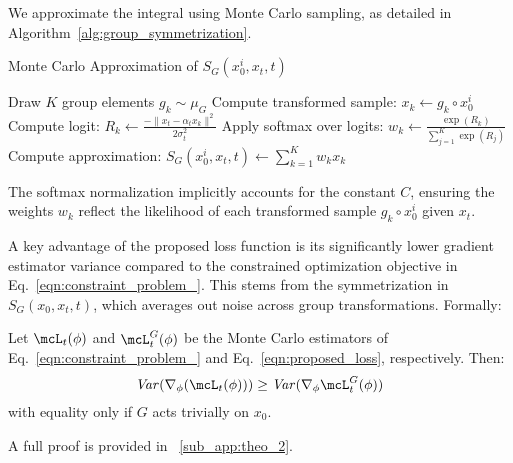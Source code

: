 We approximate the integral using Monte Carlo sampling, as detailed in Algorithm~\ref{alg:group_symmetrization}.  

\begin{algorithm}[H]
    \caption{Monte Carlo Approximation of \( S_G(x_0^i, x_t, t) \)}
    \label{alg:group_symmetrization}
    \begin{algorithmic}[1]
        \STATE Draw \( K \) group elements \( g_k \sim \mu_G \)
            \STATE Compute transformed sample: \( x_k \leftarrow g_k \circ x_0^i \)
            \STATE Compute logit: \( R_k \leftarrow \frac{-\| x_t - \alpha_t x_k \|^2}{2\sigma_t^2} \)
        \ENDFOR
        \STATE Apply softmax over logits: \( w_k \leftarrow \frac{\exp(R_k)}{\sum_{j=1}^K \exp(R_j)} \)
        \STATE Compute approximation: \( S_G(x_0^i, x_t, t) \leftarrow \sum_{k=1}^K w_k x_k \)
    \end{algorithmic}
\end{algorithm}



The softmax normalization implicitly accounts for the constant \(C\), ensuring the weights \(w_k\) reflect the likelihood of each transformed sample \(g_k \circ x_0^i\) given \(x_t\).



A key advantage of the proposed loss function is its significantly lower gradient estimator variance compared to the constrained optimization objective in Eq.~\eqref{eqn:constraint_problem_}. This stems from the symmetrization in \(S_G(x_0, x_t, t)\), which averages out noise across group transformations. Formally:
\begin{tcolorbox}[title=Variance Reduction of the Proposed Loss]
\begin{theorem}
Let \(\mcL_t(\phi)\) and \(\mcL_t^G(\phi)\) be the Monte Carlo estimators of Eq.~\eqref{eqn:constraint_problem_} and Eq.~\eqref{eqn:proposed_loss}, respectively. Then:
\begin{equation}
    \text{\emph{Var}}(\nabla_\phi(\mcL_t(\phi))) \geq \text{\emph{Var}}(\nabla_\phi\mcL_t^G(\phi))
\end{equation}
with equality only if \(G\) acts trivially on \(x_0\). 
\label{the:theo_2}
\end{theorem}
\end{tcolorbox}
A full proof is provided in ~\cref{sub_app:theo_2}.


